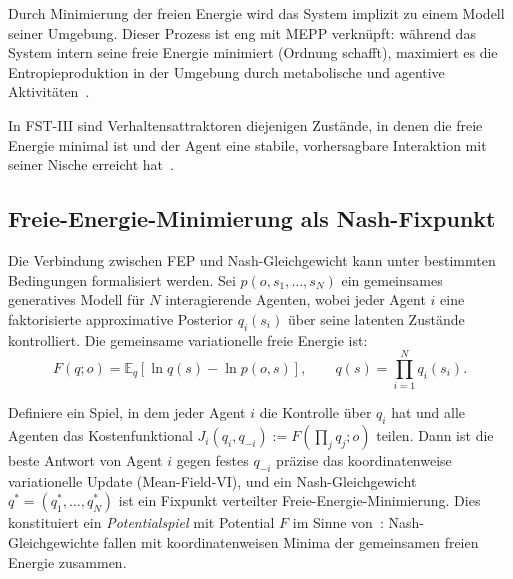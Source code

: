\documentclass[12pt,a4paper]{article}
\theoremstyle{remark}
\begin{document}
Durch Minimierung der freien Energie wird das System implizit zu einem Modell seiner Umgebung. Dieser Prozess ist eng mit MEPP verknüpft: während das System intern seine freie Energie minimiert (Ordnung schafft), maximiert es die Entropieproduktion in der Umgebung durch metabolische und agentive Aktivitäten~\citep{FristonPDF}.

In FST-III sind Verhaltensattraktoren diejenigen Zustände, in denen die freie Energie minimal ist und der Agent eine stabile, vorhersagbare Interaktion mit seiner Nische erreicht hat~\citep{FristonFreeEnergy}.

\subsection{Freie-Energie-Minimierung als Nash-Fixpunkt}

Die Verbindung zwischen FEP und Nash-Gleichgewicht kann unter bestimmten Bedingungen formalisiert werden. Sei $p(o,s_1,\dots,s_N)$ ein gemeinsames generatives Modell für $N$ interagierende Agenten, wobei jeder Agent $i$ eine faktorisierte approximative Posterior $q_i(s_i)$ über seine latenten Zustände kontrolliert. Die gemeinsame variationelle freie Energie ist:
\begin{equation}
F(q; o) = \mathbb{E}_q\!\left[\ln q(s) - \ln p(o, s)\right], \qquad q(s) = \prod_{i=1}^{N} q_i(s_i).
\end{equation}

Definiere ein Spiel, in dem jeder Agent $i$ die Kontrolle über $q_i$ hat und alle Agenten das Kostenfunktional $J_i(q_i, q_{-i}) := F(\prod_j q_j; o)$ teilen. Dann ist die beste Antwort von Agent $i$ gegen festes $q_{-i}$ präzise das koordinatenweise variationelle Update (Mean-Field-VI), und ein Nash-Gleichgewicht $q^* = (q_1^*, \dots, q_N^*)$ ist ein Fixpunkt verteilter Freie-Energie-Minimierung. Dies konstituiert ein \emph{Potentialspiel} mit Potential $F$ im Sinne von~\citet{MondererShapley1996}: Nash-Gleichgewichte fallen mit koordinatenweisen Minima der gemeinsamen freien Energie zusammen.
\end{document}
